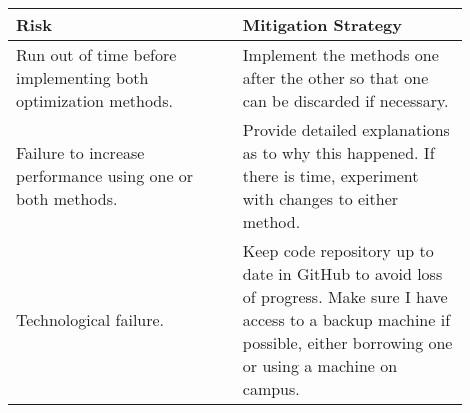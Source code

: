 \begin{tabular}{||p{0.45\linewidth}|p{0.45\linewidth}||}
	\hline
	Risk & Mitigation Strategy\\
	\hline\hline
	Run out of time before implementing both optimization methods. & Implement the methods one after the other so that one can be discarded if necessary.\\
	\hline
	Failure to increase performance using one or both methods. & Provide detailed explanations as to why this happened. If there is time, experiment with changes to either method.\\
	\hline
	Technological failure. & Keep code repository up to date in GitHub to avoid loss of progress. Make sure I have access to a backup machine if possible, either borrowing one or using a machine on campus.\\
	\hline
\end{tabular}
